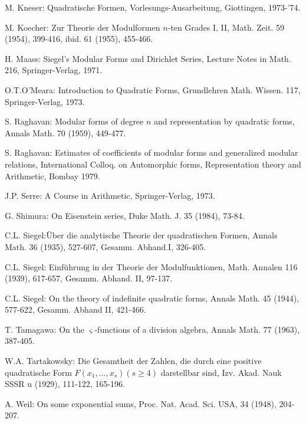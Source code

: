\begin{thebibliography}{99}
 M. Kneser: Quadratische Formen,
Vorlesungs-Ausarbeitung, Giottingen, 1973-'74.

 M. Koecher: Zur Theorie der Modulformen $n$-ten
Grades I, II, Math. Zeit. 59 (1954), 399-416, ibid. 61 (1955),
455-466. 

 H. Maass: Siegel's Modular Forms and Dirichlet
Series, Lecture Notes in Math. 216, Springer-Verlag, 1971.

 O.T.O'Meara: Introduction to Quadratic Forms,
Grundlehren Math. Wissen. 117, Springer-Verlag, 1973. 

 S. Raghavan: Modular forms of degree $n$ and
representation by quadratic forms, Annals Math. 70 (1959), 449-477.

 S. Raghavan: Estimates of coefficients of modular
forms and generalized modular relations, International Colloq. on
Automorphic forms, Representation theory and Arithmetic, Bombay 1979.

 J.P. Serre: A Course in Arithmetic, Springer-Verlag,
1973. 

 G. Shimura: On Eisenstein series, Duke Math. J. 35
(1984), 73-84. 

 C.L. Siegel:\pageoriginale \"Uber die analytische
Theorie der quadratischen Formen, Annals Math. 36 (1935), 527-607,
Gesamm. Abhand.I, 326-405.

 C.L. Siegel: Einf\"uhrung in der Theorie der
Modulfunktionen, Math. Annalen 116 (1939), 617-657,
Gesamm. Abhand. II, 97-137.

 C.L. Siegel: On the theory of indefinite quadratic
forms, Annals Math. 45 (1944), 577-622, Gesamm. Abhand II, 421-466.

 T. Tamagawa: On the $\varsigma$-functions of a
division algebra, Annals Math. 77 (1963), 387-405.

 W.A. Tartakowsky: Die Gesamtheit der Zahlen, die
durch eine positive quadratische Form $F(x_1, \ldots, x_s)(s\geq 4)$
darstellbar sind, Izv. Akad. Nauk SSSR u (1929), 111-122, 165-196.

 A. Weil: On some exponential sums,
Proc. Nat. Acad. Sci. USA, 34 (1948), 204-207.

\end{thebibliography}
